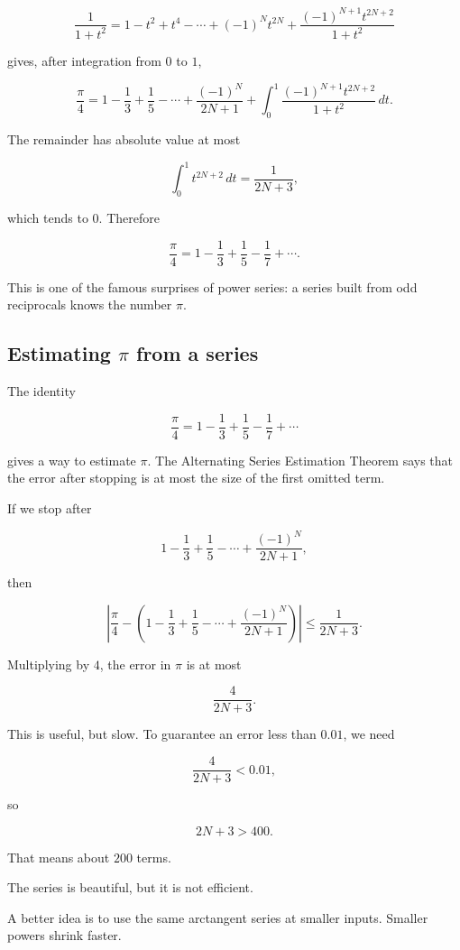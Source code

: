 \[
\frac1{1+t^2}
=
1-t^2+t^4-\cdots+(-1)^N t^{2N}
+
\frac{(-1)^{N+1}t^{2N+2}}{1+t^2}
\]

gives, after integration from \(0\) to \(1\),

\[
\frac{\pi}{4}
=
1-\frac13+\frac15-\cdots+\frac{(-1)^N}{2N+1}
+
\int_0^1
\frac{(-1)^{N+1}t^{2N+2}}{1+t^2}\,dt.
\]

The remainder has absolute value at most

\[
\int_0^1 t^{2N+2}\,dt
=
\frac1{2N+3},
\]

which tends to \(0\).  Therefore

\[
\boxed{
\frac{\pi}{4}
=
1-\frac13+\frac15-\frac17+\cdots.
}
\]

This is one of the famous surprises of power series: a series built from odd
reciprocals knows the number \(\pi\).

\subsection{\texorpdfstring{Estimating \(\pi\) from a series}{Estimating pi from a series}}
\label{subsec:estimating-pi-from-series}

The identity

\[
\frac{\pi}{4}
=
1-\frac13+\frac15-\frac17+\cdots
\]

gives a way to estimate \(\pi\).  The Alternating Series Estimation Theorem says that
the error after stopping is at most the size of the first omitted term.

If we stop after

\[
1-\frac13+\frac15-\cdots+\frac{(-1)^N}{2N+1},
\]

then

\[
\left|
\frac{\pi}{4}
-
\left(1-\frac13+\frac15-\cdots+\frac{(-1)^N}{2N+1}\right)
\right|
\le
\frac1{2N+3}.
\]

Multiplying by \(4\), the error in \(\pi\) is at most

\[
\boxed{
\frac4{2N+3}.
}
\]

This is useful, but slow.  To guarantee an error less than \(0.01\), we need

\[
\frac4{2N+3}<0.01,
\]

so

\[
2N+3>400.
\]

That means about \(200\) terms.

The series is beautiful, but it is not efficient.

A better idea is to use the same arctangent series at smaller inputs.  Smaller powers
shrink faster.

